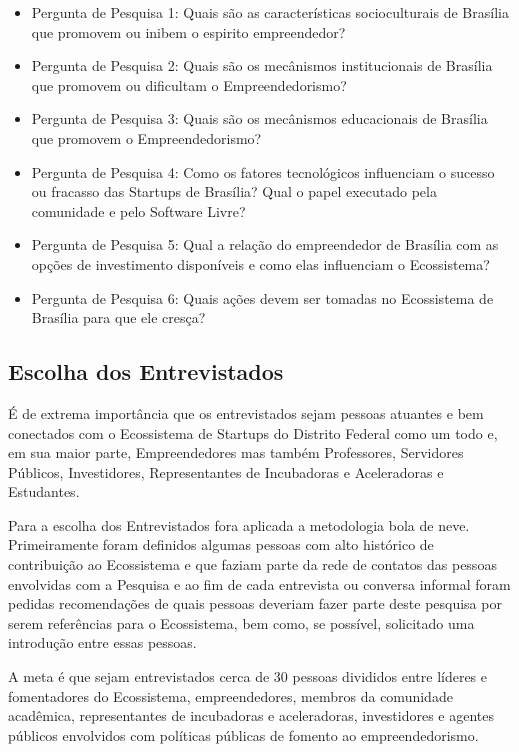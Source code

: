 \begin{itemize}
  \item Pergunta de Pesquisa 1: Quais são as características socioculturais de Brasília que promovem ou inibem o espirito empreendedor?
  \item Pergunta de Pesquisa 2: Quais são os mecânismos institucionais de Brasília que promovem ou dificultam o Empreendedorismo?
  \item Pergunta de Pesquisa 3: Quais são os mecânismos educacionais de Brasília que promovem o Empreendedorismo?
  \item Pergunta de Pesquisa 4: Como os fatores tecnológicos influenciam o sucesso ou fracasso das Startups de Brasília? Qual o papel executado pela comunidade e pelo Software Livre?
  \item Pergunta de Pesquisa 5: Qual a relação do empreendedor de Brasília com as opções de investimento disponíveis e como elas influenciam o Ecossistema?
  \item Pergunta de Pesquisa 6: Quais ações devem ser tomadas no Ecossistema de Brasília para que ele cresça?
\end{itemize}

\subsection{Escolha dos Entrevistados}
\label{subsection:escolha_dos_entrevistados}

É de extrema importância que os entrevistados sejam pessoas atuantes e bem conectados com o Ecossistema de Startups do Distrito Federal como um todo e, em sua maior parte, Empreendedores mas também Professores, Servidores Públicos, Investidores, Representantes de Incubadoras e Aceleradoras e Estudantes. 

Para a escolha dos Entrevistados fora aplicada a metodologia bola de neve. Primeiramente foram definidos algumas pessoas com alto histórico de contribuição ao Ecossistema e que faziam parte da rede de contatos das pessoas envolvidas com a Pesquisa e ao fim de cada entrevista ou conversa informal foram pedidas recomendações de quais pessoas deveriam fazer parte deste pesquisa por serem referências para o Ecossistema, bem como, se possível, solicitado uma introdução entre essas pessoas. 

A meta é que sejam entrevistados cerca de 30 pessoas divididos entre líderes e fomentadores do Ecossistema, empreendedores, membros da comunidade acadêmica, representantes de incubadoras e aceleradoras, investidores e agentes públicos envolvidos com políticas públicas de fomento ao empreendedorismo. 

